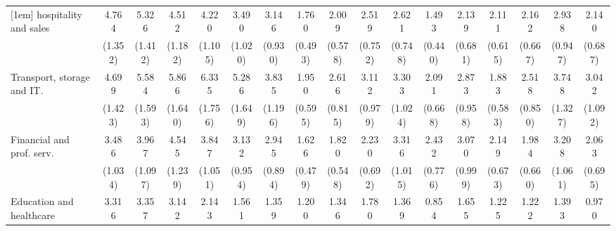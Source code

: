 {\begin{tabular}{l*{16}{c}}
[1em]
hospitality and sales&       4.764\sym{***}&       5.326\sym{***}&       4.512\sym{***}&       4.220\sym{***}&       3.490\sym{***}&       3.146\sym{***}&       1.760\sym{*}  &       2.009\sym{*}  &       2.519\sym{**} &       2.621\sym{***}&       1.493         &       2.139\sym{*}  &       2.111\sym{*}  &       2.162\sym{*}  &       2.938\sym{***}&       2.140\sym{*}  \\
                    &     (1.352)         &     (1.412)         &     (1.182)         &     (1.105)         &     (1.020)         &     (0.930)         &     (0.493)         &     (0.578)         &     (0.752)         &     (0.748)         &     (0.440)         &     (0.681)         &     (0.615)         &     (0.667)         &     (0.947)         &     (0.687)         \\
[1em]
Transport, storage and IT.&       4.699\sym{***}&       5.584\sym{***}&       5.866\sym{***}&       6.335\sym{***}&       5.286\sym{***}&       3.835\sym{***}&       1.950\sym{*}  &       2.616\sym{**} &       3.112\sym{***}&       3.303\sym{***}&       2.091\sym{*}  &       2.873\sym{**} &       1.883\sym{*}  &       2.518\sym{**} &       3.748\sym{***}&       3.042\sym{**} \\
                    &     (1.423)         &     (1.593)         &     (1.640)         &     (1.756)         &     (1.649)         &     (1.196)         &     (0.595)         &     (0.815)         &     (0.979)         &     (1.024)         &     (0.668)         &     (0.958)         &     (0.583)         &     (0.850)         &     (1.327)         &     (1.092)         \\
[1em]
Financial and prof. serv.&       3.486\sym{***}&       3.967\sym{***}&       4.545\sym{***}&       3.847\sym{***}&       3.132\sym{***}&       2.945\sym{***}&       1.626         &       1.820\sym{*}  &       2.230\sym{**} &       3.316\sym{***}&       2.432\sym{**} &       3.070\sym{***}&       2.149\sym{*}  &       1.984\sym{*}  &       3.208\sym{***}&       2.063\sym{*}  \\
                    &     (1.034)         &     (1.097)         &     (1.239)         &     (1.051)         &     (0.954)         &     (0.894)         &     (0.479)         &     (0.548)         &     (0.692)         &     (1.015)         &     (0.776)         &     (0.999)         &     (0.673)         &     (0.660)         &     (1.061)         &     (0.695)         \\
[1em]
Education and healthcare&       3.316\sym{***}&       3.357\sym{***}&       3.142\sym{***}&       2.143\sym{*}  &       1.561         &       1.359         &       1.200         &       1.346         &       1.780         &       1.369         &       0.854         &       1.655         &       1.225         &       1.222         &       1.393         &       0.970         \\

\end{tabular}}
